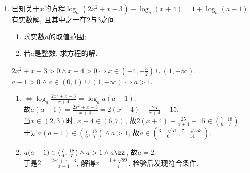\begin{enumerate}
\begin{jieda}
    \end{jieda}
    \item 已知关于$x$的方程$\log_a(2x^2+x-3)-\log_a(x+4)=1+\log_a(a-1)$有实数解, 且其中之一在2与3之间. 
    \begin{enumerate}[(1)]
    \item 求实数$a$的取值范围; 
    \item 若$a$是整数, 求方程的解.
    \end{enumerate}
    \begin{jieda}
    $2x^2+x-3>0\land x+4>0\iff x\in(-4,-\frac{3}{2})\cup(1,+\infty)$. \\
    $a-1>0\land a\in(0,1)\cup(1,+\infty)\iff a>1$. 
    \begin{enumerate}[(1)]
    \item $\iff \log_a\frac{2x^2+x-3}{x+4}=\log_aa(a-1)$. \\
    故$a(a-1)=\frac{2x^2+x-3}{x+4}=2(x+4)+\frac{25}{x+4}-15$. \\
    当$x\in(2,3)$时, $x+4\in(6,7)$, 故$2(x+4)+\frac{25}{x+4}-15\in(\frac{7}{6},\frac{18}{7})$. \\
    于是$a(a-1)\in(\frac{7}{6},\frac{18}{7})\land a>1$, 故$a\in\left(\frac{3+\sqrt{51}}{6},\frac{7+\sqrt{553}}{14}\right)$. 
    
    \item $a(a-1)\in(\frac{7}{6},\frac{18}{7})\land a>1\land a\zz$, 故$a=2$. \\
    于是$2=\frac{2x^2+x-3}{x+4}$, 解得$x=\frac{1\pm\sqrt{89}}{4}$. 检验后发现符合条件. 
    \end{enumerate}
    \end{jieda}
\end{enumerate}
